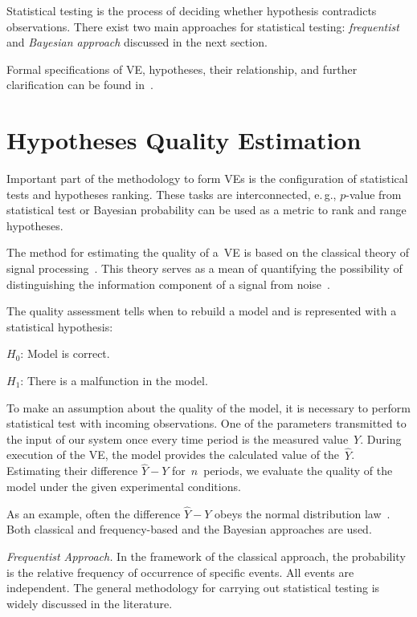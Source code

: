 \begin{multicols}{2}
      Statistical testing is the process of deciding whether hypothesis contradicts 
observations. There exist two main approaches for statistical testing: 
\textit{frequentist} and \textit{Bayesian approach} discussed in the next section. 
      
      Formal specifications of VE, hypotheses, their relationship,  and further 
clarification can be found in~\cite{3-tar}.

\section{Hypotheses Quality Estimation}

      \noindent
      Important part of the methodology to form VEs is the 
configuration of statistical tests and hypotheses ranking. These tasks are 
interconnected, e.\,g., $p$-value from statistical test or Bayesian probability can be 
used as a metric to rank and range hypotheses.
      
      The method for estimating the quality of a~VE is based on the 
classical theory of signal processing~\cite{18-tar}. This theory serves as a mean of 
quantifying the possibility of distinguishing the information component of a signal 
from noise~\cite{19-tar}.
      
      The quality assessment tells when to rebuild a model and is represented with a 
statistical hypothesis:
      \begin{description}
      \item    $H_0$:   Model is correct.
      \item    $H_1$:  There is a malfunction in the model.
      \end{description}
      
To make an assumption about the quality of the model, it is necessary 
to perform statistical test with incoming observations. One of the parameters 
transmitted to the input of our system once every time period is the measured 
value~$Y$. During execution of the VE, the model provides the 
calculated value of the~$\hat{Y}$. Estimating their difference $\hat{Y}- Y$  
for~$n$~periods, we evaluate the quality of the model under the given experimental 
conditions.
      
      As an example, often the difference $\hat{Y}- Y$ obeys the normal 
distribution law~\cite{20-tar}. Both classical and frequency-based and the Bayesian 
approaches are used.
      
      \textit{Frequentist Approach.} In the framework of the classical approach, the 
probability is the relative frequency of occurrence of specific events. All events are 
independent. The general methodology for carrying out statistical testing is widely 
discussed in the literature.
      

\end{multicols}
